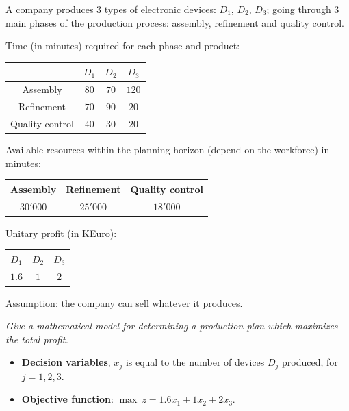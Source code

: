\highspace
\begin{examplebox}
    A company produces 3 types of electronic devices: $D_{1}$, $D_{2}$, $D_{3}$; going through 3 main phases of the production process: assembly, refinement and quality control.

    Time (in minutes) required for each phase and product:

    \begin{center}
        \begin{tabular}{@{} c | c c c @{}}
            & $D_{1}$ & $D_{2}$ & $D_{3}$ \\
            \midrule
            Assembly        & $80$ & $70$ & $120$ \\
            Refinement      & $70$ & $90$ & $20$ \\
            Quality control & $40$ & $30$ & $20$
        \end{tabular}
    \end{center}

    Available resources within the planning horizon (depend on the workforce) in minutes:
    \begin{center}
        \begin{tabular}{@{} c | c | c @{}}
            Assembly & Refinement & Quality control \\
            \midrule
            $30'000$ & $25'000$ & $18'000$
        \end{tabular}
    \end{center}

    Unitary profit (in KEuro):
    \begin{center}
        \begin{tabular}{@{} c | c | c @{}}
            $D_{1}$ & $D_{2}$ & $D_{3}$ \\
            \midrule
            $1.6$ & $1$ & $2$
        \end{tabular}
    \end{center}
    
    Assumption: the company can sell whatever it produces.

    \emph{Give a mathematical model for determining a production plan which maximizes the total profit.}

    \begin{itemize}
        \item \textbf{Decision variables}, $x_{j}$ is equal to the number of devices $D_{j}$ produced, for $j = 1, 2, 3$.
        
        \item \textbf{Objective function}: $\max \: z = 1.6x_{1} + 1x_{2} + 2x_{3}$.


\end{itemize}
\end{examplebox}
